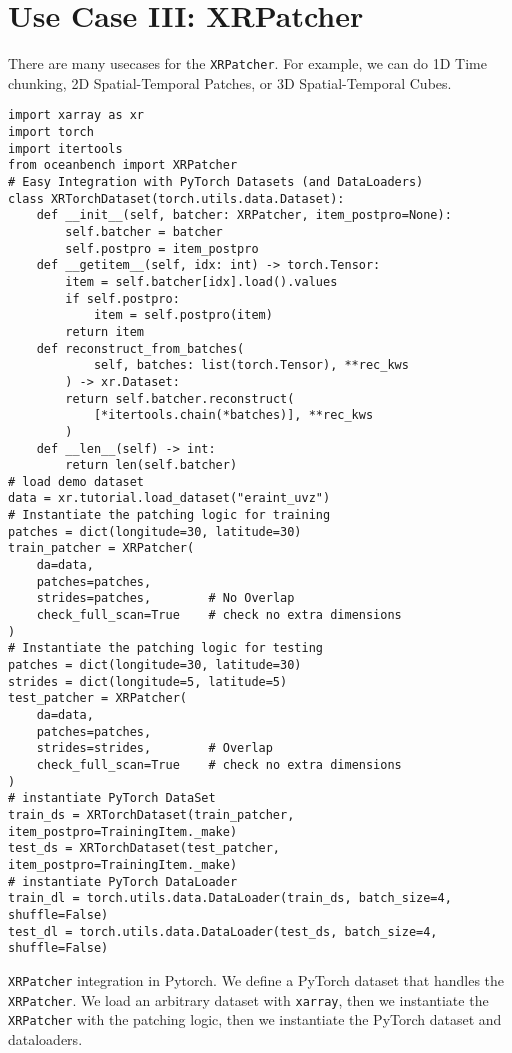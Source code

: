\section{Use Case III: XRPatcher}
\label{sec:xrpatcher}

There are many usecases for the \texttt{XRPatcher}. For example, we can do 1D Time chunking, 2D Spatial-Temporal Patches, or 3D Spatial-Temporal Cubes.


\begin{listing}[!ht]
\small
\begin{verbatim}
import xarray as xr
import torch
import itertools
from oceanbench import XRPatcher
# Easy Integration with PyTorch Datasets (and DataLoaders)
class XRTorchDataset(torch.utils.data.Dataset):
    def __init__(self, batcher: XRPatcher, item_postpro=None):
        self.batcher = batcher
        self.postpro = item_postpro
    def __getitem__(self, idx: int) -> torch.Tensor:
        item = self.batcher[idx].load().values
        if self.postpro:
            item = self.postpro(item)
        return item
    def reconstruct_from_batches(
            self, batches: list(torch.Tensor), **rec_kws
        ) -> xr.Dataset:
        return self.batcher.reconstruct(
            [*itertools.chain(*batches)], **rec_kws
        )
    def __len__(self) -> int:
        return len(self.batcher)
# load demo dataset
data = xr.tutorial.load_dataset("eraint_uvz")
# Instantiate the patching logic for training
patches = dict(longitude=30, latitude=30)
train_patcher = XRPatcher(
    da=data,
    patches=patches,
    strides=patches,        # No Overlap
    check_full_scan=True    # check no extra dimensions
)
# Instantiate the patching logic for testing
patches = dict(longitude=30, latitude=30)
strides = dict(longitude=5, latitude=5)
test_patcher = XRPatcher(
    da=data,
    patches=patches,
    strides=strides,        # Overlap
    check_full_scan=True    # check no extra dimensions
)
# instantiate PyTorch DataSet
train_ds = XRTorchDataset(train_patcher, item_postpro=TrainingItem._make)
test_ds = XRTorchDataset(test_patcher, item_postpro=TrainingItem._make)
# instantiate PyTorch DataLoader
train_dl = torch.utils.data.DataLoader(train_ds, batch_size=4, shuffle=False)
test_dl = torch.utils.data.DataLoader(test_ds, batch_size=4, shuffle=False)
\end{verbatim}
\label{listing:xrpatcher}
\caption{\texttt{XRPatcher} integration in Pytorch. We define a PyTorch dataset that handles the \texttt{XRPatcher}. We load an arbitrary dataset with \texttt{xarray}, then we instantiate the \texttt{XRPatcher} with the patching logic, then we instantiate the PyTorch dataset and dataloaders.}
\end{listing}




